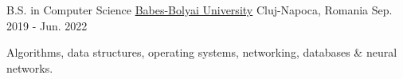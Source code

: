 

\begin{cventries}

  \cventry
    {B.S. in Computer Science} %
    {\href{https://www.cs.ubbcluj.ro/en}{Babes-Bolyai University}} %
    {Cluj-Napoca, Romania} %
    {Sep. 2019 - Jun. 2022} %
    {
      \begin{cvitems} %
        \item {Algorithms, data structures, operating systems, networking, databases \& neural networks.}
      \end{cvitems}
    }
    
\end{cventries}
